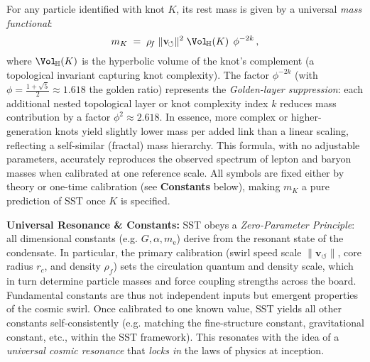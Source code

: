 \documentclass[10pt,a4paper]{article}
\begin{document}
\begin{tcolorbox}[title=\textbf{Mass Functional (Knot Soliton Energy)}]
For any particle identified with knot $K$, its rest mass is given by a universal \emph{mass functional}\cite{Iskandarani2025_Lagrangian}:
\[
    m_{K} \;=\; \rho_{\!f}\;\|\mathbf{v}_{\!\boldsymbol{\circlearrowleft}}\|^2\;\Vol_{\!\mathbb{H}}(K)\;\,\phi^{-2k}\,,
\]
where $\Vol_{\!\mathbb{H}}(K)$ is the hyperbolic volume of the knot’s complement (a topological invariant capturing knot complexity). The factor $\phi^{-2k}$ (with $\phi=\frac{1+\sqrt{5}}{2}\approx1.618$ the golden ratio) represents the \emph{Golden-layer suppression}: each additional nested topological layer or knot complexity index $k$ reduces mass contribution by a factor $\phi^2\approx2.618$. In essence, more complex or higher-generation knots yield slightly lower mass per added link than a linear scaling, reflecting a self-similar (fractal) mass hierarchy. This formula, with no adjustable parameters, accurately reproduces the observed spectrum of lepton and baryon masses when calibrated at one reference scale. All symbols are fixed either by theory or one-time calibration (see \textbf{Constants} below), making $m_K$ a pure prediction of SST once $K$ is specified.
\end{tcolorbox}

\noindent \textbf{Universal Resonance \& Constants:} SST obeys a \emph{Zero-Parameter Principle}: all dimensional constants (e.g. $G, \alpha, m_{\text{e}}$) derive from the resonant state of the condensate. In particular, the primary calibration (swirl speed scale $\|\mathbf{v}_{\!\boldsymbol{\circlearrowleft}}\|$, core radius $r_c$, and density $\rho_{\!f}$) sets the circulation quantum and density scale, which in turn determine particle masses and force coupling strengths across the board. Fundamental constants are thus not independent inputs but emergent properties of the cosmic swirl. Once calibrated to one known value, SST yields all other constants self-consistently (e.g. matching the fine-structure constant, gravitational constant, etc., within the SST framework). This resonates with the idea of a \emph{universal cosmic resonance} that \textit{locks in} the laws of physics at inception.
\end{document}
